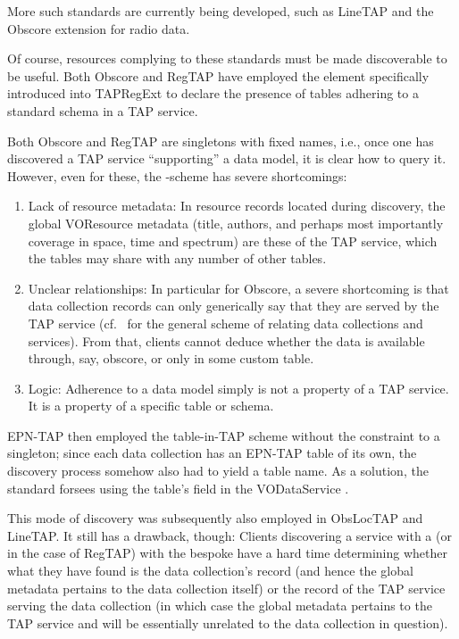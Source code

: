 \documentclass[11pt,a4paper]{ivoa}
\begin{document}
More such standards are currently being developed, such as LineTAP
\citep{wd:linetap23} and the Obscore extension for radio data.

Of course, resources complying to these standards must be made
discoverable to be useful.  Both Obscore and RegTAP have employed the
 element specifically introduced into TAPRegExt
\citep{2012ivoa.spec.0827D} to declare the presence of tables adhering
to a standard schema in a TAP service.

Both Obscore and RegTAP are singletons with fixed names, i.e., once one
has discovered a TAP service ``supporting'' a data model, it is clear
how to query it.  However, even for these, the -scheme
has severe shortcomings:

\begin{enumerate}
\item Lack of resource metadata: In resource records located during
discovery, the global VOResource metadata (title, authors, and perhaps
most importantly coverage in space, time and spectrum) are these of the
TAP service, which the tables may share with any number of other tables.

\item Unclear relationships: In particular for Obscore, a severe
shortcoming is that data collection records can only generically say
that they are served by the TAP service (cf.~\citet{2019ivoa.spec.0520D}
for the general scheme of relating data collections and services).  From
that, clients cannot deduce whether the data is available through, say,
obscore, or only in some custom table.

\item Logic: Adherence to a data model simply is not a property of a
TAP service.  It is a property of a specific table or schema.
\end{enumerate}

EPN-TAP then employed the table-in-TAP scheme without the constraint to
a singleton; since each data collection has an EPN-TAP table of its own,
the discovery process somehow also had to yield a table name.  As a
solution, the standard forsees using the table's  field in
the VODataService \citep{2010ivoa.spec.1202P} .

This mode of discovery was subsequently also employed in ObsLocTAP and
LineTAP.  It still has a drawback, though: Clients discovering a service
with a  (or  in the case of RegTAP) with the
bespoke  have a hard time determining whether what they
have found is the data collection's record (and hence the global
metadata pertains to the data collection itself) or the record of the
TAP service serving the data collection (in which case the global
metadata pertains to the TAP service and will be essentially unrelated
to the data collection in question).
\end{document}
